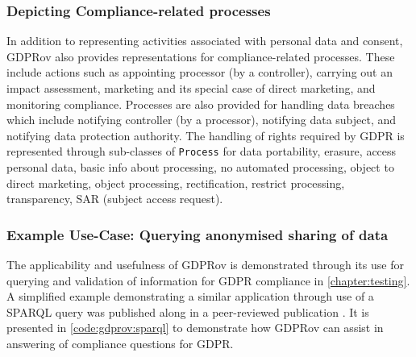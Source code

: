 \subsubsection{Depicting Compliance-related processes}
In addition to representing activities associated with personal data and consent, GDPRov also provides representations for compliance-related processes.
These include actions such as appointing processor (by a controller), carrying out an impact assessment, marketing and its special case of direct marketing, and monitoring compliance.
Processes are also provided for handling data breaches which include notifying controller (by a processor), notifying data subject, and notifying data protection authority.
The handling of rights required by GDPR is represented through sub-classes of \texttt{Process} for data portability, erasure, access personal data, basic info about processing, no automated processing, object to direct marketing, object processing, rectification, restrict processing, transparency, SAR (subject access request).



\subsubsection{Example Use-Case: Querying anonymised sharing of data}
The applicability and usefulness of GDPRov is demonstrated through its use for querying and validation of information for GDPR compliance in \autoref{chapter:testing}.
A simplified example demonstrating a similar application through use of a SPARQL query was published along in a peer-reviewed publication \cite{pandit_modelling_2017}. It is presented in \autoref{code:gdprov:sparql} to demonstrate how GDPRov can assist in answering of compliance questions for GDPR.

